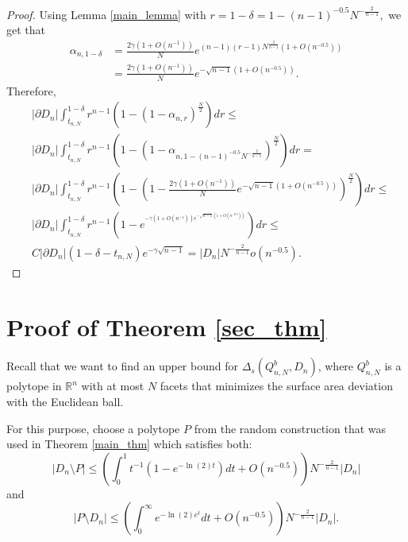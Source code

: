 \documentclass[10pt, twoside, leqno]{article}
\theoremstyle{definition}
\numberwithin{equation}{section}
\newcommand{\R}{\mathbb{R}}
\newcommand{\NN}{N^{-\frac 2{n-1} }}
\begin{document}
\begin{proof}
	Using Lemma \ref{main_lemma} with $ r = {1-\delta}=1-\left(n-1\right)^{-0.5}N^{-\frac{2}{n-1}},$ we get that
	\begin{align*}
	\alpha_{n,{1-\delta}}&=\frac{2\gamma\left(1+O\left(n^{-1}\right)\right)}{N}e^{\left(n-1\right)\left(r-1\right)N^{\frac{2}{n-1}}\left(1+O\left(n^{-0.5}\right)\right)}\\&=\frac{2\gamma\left(1+O\left(n^{-1}\right)\right)}{N}e^{-\sqrt{n-1}\left(1+O\left(n^{-0.5}\right)\right)}.
	\end{align*}
	Therefore,
	\begin{equation}\begin{aligned} & |\partial D_{n}|\int_{t_{n,N}}^{1-\delta}r^{n-1}\left(1-\left(1-\alpha_{n,r}\right)^{\frac{N}{2}}\right)dr\leq\\
	& |\partial D_{n}|\int_{t_{n,N}}^{1-\delta}r^{n-1}\left(1-\left(1-\alpha_{n,1-\left(n-1\right)^{-0.5}N^{-\frac{2}{n-1}}}\right)^{\frac{N}{2}}\right)dr=\\
	& |\partial D_{n}|\int_{t_{n,N}}^{1-\delta}r^{n-1}\left(1-\left(1-\frac{2\gamma\left(1+O\left(n^{-1}\right)\right)}{N}e^{-\sqrt{n-1}\left(1+O\left(n^{-0.5}\right)\right)}\right)^{\frac{N}{2}}\right)dr\leq\\
	& |\partial D_{n}|\int_{t_{n,N}}^{1-\delta}r^{n-1}\left(1-e^{^{-\gamma\left(1+O\left(n^{-1}\right)\right)e^{-\sqrt{n-1}\left(1+O\left(n^{-0.5}\right)\right)}}}\right)dr\leq\\
	& C|\partial D_{n}|(1-\delta-t_{n,N})e^{-\gamma\sqrt{n-1}}=|D_{n}|\NN o\left(n^{-0.5}\right).
	\end{aligned}
	\end{equation}
\end{proof}

\section{Proof of Theorem \ref{sec_thm}}
Recall that we want to find an upper bound for  $ \Delta_s\left(Q^b_{n,N}, D_n\right)$, where $ Q^b_{n,N} $ is a polytope in $ \R^n $ with at most $ N $ facets that minimizes the surface area deviation with the Euclidean ball.

For this purpose, choose a polytope $P$ from the random construction that was used in Theorem \ref{main_thm} which satisfies both: 
\[
|D_n \setminus P| \leq \left(\int_{0}^{1} t^{-1}(1-e^{-\ln(2)t})dt + O(n^{-0.5})\right)\NN|D_n|
\]
and
\[
|P \setminus D_n| \leq \left( \int_{0}^{\infty}e^{-\ln(2)e^{t}}dt + O(n^{-0.5})\right)\NN|D_n|.
\]
%
\end{document}
